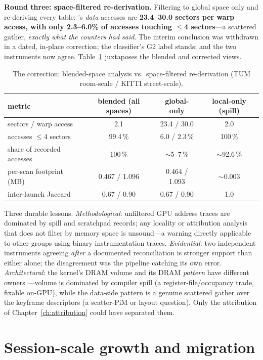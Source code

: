 \textbf{Round three: space-filtered re-derivation.} Filtering to
global space only and re-deriving every table: \stTrack{}'s \emph{data}
accesses are \textbf{23.4--30.0 sectors per warp access, with only
2.3--6.0\% of accesses touching $\leq$4 sectors}---a scattered gather,
\emph{exactly what the counters had said}. The interim conclusion was
withdrawn in a dated, in-place correction; the classifier's G2 label stands;
and the two instruments now agree. Table~\ref{tab:sttrack} juxtaposes the
blended and corrected views.

\begin{table}[t]
\centering
\caption{The \stTrack{} correction: blended-space analysis vs.\
space-filtered re-derivation (TUM room-scale / KITTI street-scale).}
\label{tab:sttrack}
\begin{tabular}{@{}lccc@{}}
\toprule
metric & blended (all spaces) & global-only & local-only (spill) \\
\midrule
sectors / warp access & 2.1 & 23.4 / 30.0 & 2.0 \\
accesses $\leq$4 sectors & 99.4\,\% & 6.0 / 2.3\,\% & 100\,\% \\
share of recorded accesses & 100\,\% & $\sim$5--7\,\% & $\sim$92.6\,\% \\
per-scan footprint (MB) & 0.467 / 1.096 & 0.464 / 1.093 & $\sim$0.003 \\
inter-launch Jaccard & 0.67 / 0.90 & 0.67 / 0.90 & 1.0 \\
\bottomrule
\end{tabular}
\end{table}

Three durable lessons. \emph{Methodological}: unfiltered GPU address traces
are dominated by spill and scratchpad records; any locality or attribution
analysis that does not filter by memory space is unsound---a warning
directly applicable to other groups using binary-instrumentation traces.
\emph{Evidential}: two independent instruments agreeing \emph{after} a
documented reconciliation is stronger support than either alone; the
disagreement was the pipeline catching its own error. \emph{Architectural}:
the kernel's DRAM volume and its DRAM \emph{pattern} have different owners
---volume is dominated by compiler spill (a register-file/occupancy trade,
fixable on-GPU), while the data-side pattern is a genuine scattered gather
over the keyframe descriptors (a scatter-PiM or layout question). Only the
attribution of Chapter~\ref{ch:attribution} could have separated them.

\section{Session-scale growth and migration}
\label{sec:loc-growth}

